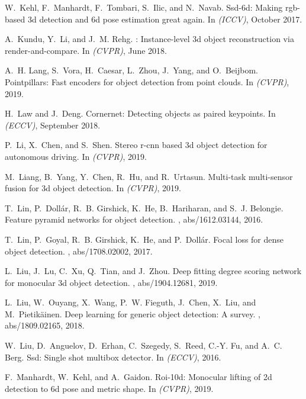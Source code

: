 \documentclass[10pt,twocolumn,letterpaper]{article}
\begin{document}
{\begin{thebibliography}{10}
W.~Kehl, F.~Manhardt, F.~Tombari, S.~Ilic, and N.~Navab.
\newblock Ssd-6d: Making rgb-based 3d detection and 6d pose estimation great
  again.
\newblock In {\em (ICCV)}, October 2017.

A.~Kundu, Y.~Li, and J.~M. Rehg.
: Instance-level 3d object reconstruction via
  render-and-compare.
\newblock In {\em (CVPR)}, June 2018.

A.~H. Lang, S.~Vora, H.~Caesar, L.~Zhou, J.~Yang, and O.~Beijbom.
\newblock Pointpillars: Fast encoders for object detection from point clouds.
\newblock In {\em (CVPR)}, 2019.

H.~Law and J.~Deng.
\newblock Cornernet: Detecting objects as paired keypoints.
\newblock In {\em (ECCV)}, September 2018.

P.~Li, X.~Chen, and S.~Shen.
\newblock Stereo r-cnn based 3d object detection for autonomous driving.
\newblock In {\em (CVPR)}, 2019.

M.~Liang, B.~Yang, Y.~Chen, R.~Hu, and R.~Urtasun.
\newblock Multi-task multi-sensor fusion for 3d object detection.
\newblock In {\em (CVPR)}, 2019.

T.~Lin, P.~Doll{\'{a}}r, R.~B. Girshick, K.~He, B.~Hariharan, and S.~J.
  Belongie.
\newblock Feature pyramid networks for object detection.
, abs/1612.03144, 2016.

T.~Lin, P.~Goyal, R.~B. Girshick, K.~He, and P.~Doll{\'{a}}r.
\newblock Focal loss for dense object detection.
, abs/1708.02002, 2017.

L.~Liu, J.~Lu, C.~Xu, Q.~Tian, and J.~Zhou.
\newblock Deep fitting degree scoring network for monocular 3d object
  detection.
, abs/1904.12681, 2019.

L.~Liu, W.~Ouyang, X.~Wang, P.~W. Fieguth, J.~Chen, X.~Liu, and
  M.~Pietik{\"{a}}inen.
\newblock Deep learning for generic object detection: {A} survey.
, abs/1809.02165, 2018.

W.~Liu, D.~Anguelov, D.~Erhan, C.~Szegedy, S.~Reed, C.-Y. Fu, and A.~C. Berg.
\newblock Ssd: Single shot multibox detector.
\newblock In {\em (ECCV)}, 2016.

F.~Manhardt, W.~Kehl, and A.~Gaidon.
\newblock Roi-10d: Monocular lifting of 2d detection to 6d pose and metric
  shape.
\newblock In {\em (CVPR)}, 2019.


\end{thebibliography}}
\end{document}

